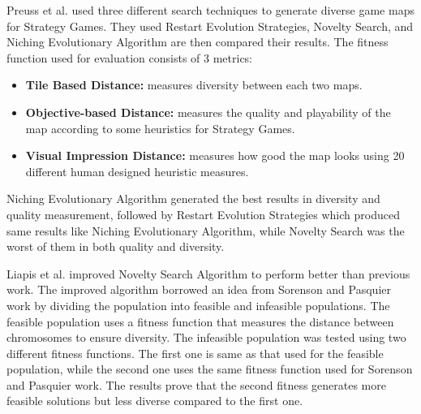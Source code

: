 Preuss et al.\cite{goodDiverseLevels} used three different search techniques to generate diverse game maps for Strategy Games. They used Restart Evolution Strategies, Novelty Search, and Niching Evolutionary Algorithm are then compared their results. The fitness function used for evaluation consists of 3 metrics:
\begin{itemize} \itemsep0pt \parskip0pt 
	\item \textbf{Tile Based Distance:} measures diversity between each two maps.
	\item \textbf{Objective-based Distance:} measures the quality and playability of the map according to some heuristics for Strategy Games.
	\item \textbf{Visual Impression Distance:} measures how good the map looks using 20 different human designed heuristic measures.
\end{itemize}
Niching Evolutionary Algorithm generated the best results in diversity and quality measurement, followed by Restart Evolution Strategies which produced same results like Niching Evolutionary Algorithm, while Novelty Search was the worst of them in both quality and diversity.\\\par

Liapis et al.\cite{noveltySearch} improved Novelty Search Algorithm to perform better than previous work\cite{goodDiverseLevels}. The improved algorithm borrowed an idea from Sorenson and Pasquier work\cite{genericLevelFramework} by dividing the population into feasible and infeasible populations. The feasible population uses a fitness function that measures the distance between chromosomes to ensure diversity. The infeasible population was tested using two different fitness functions. The first one is same as that used for the feasible population, while the second one uses the same fitness function used for Sorenson and Pasquier work\cite{genericLevelFramework}. The results prove that the second fitness generates more feasible solutions but less diverse compared to the first one.\\\par

